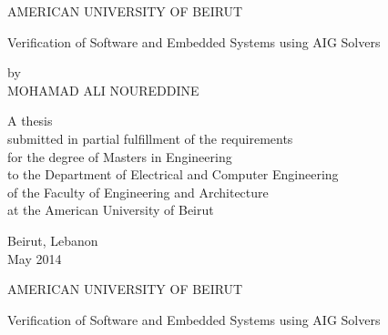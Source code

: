 \begin{titlepage}
\begin{center}



\LARGE{AMERICAN UNIVERSITY OF BEIRUT\\} \vspace{3cm}

\LARGE{Verification of Software and Embedded Systems using AIG Solvers}
\vspace{3cm}



\normalsize{by\\} \Large{MOHAMAD ALI NOUREDDINE\\}
\vspace{3cm}

 \normalsize{A
thesis \\} \normalsize{ submitted in partial fulfillment of the
requirements\\} \normalsize{for the degree of Masters in Engineering\\} \small{to the Department of Electrical and Computer
 Engineering\\}
\normalsize{of the Faculty of Engineering and Architecture\\}
\normalsize{at the American University of Beirut\\}

\vspace{4cm}
\normalsize{Beirut, Lebanon\\
 May 2014\\}
\newpage


\LARGE{AMERICAN UNIVERSITY OF BEIRUT\\}
 \vspace{3cm}

\vspace{-1.5cm}

\LARGE{Verification of Software and Embedded Systems using AIG Solvers \\} \vspace{3cm}

\vspace{-1.5cm}


\end{center}
\end{titlepage}
